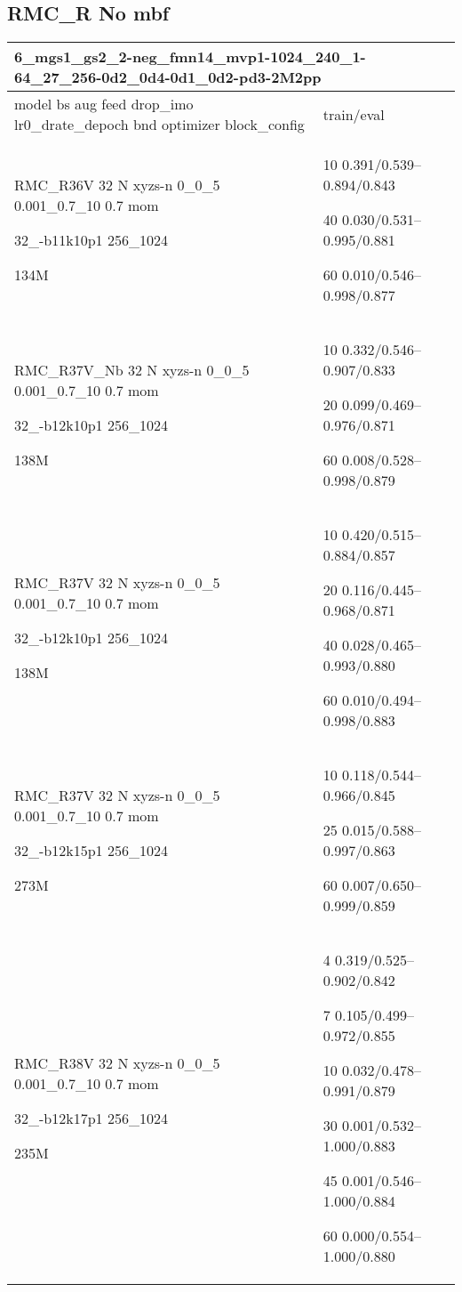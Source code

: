 \documentclass[,table,dvipsnames]{article}
\begin{document}
\subsection{RMC\_R No mbf}
\noindent\begin{tabular}{|p{10cm}|p{5cm}| }	
	\hline
	\multicolumn{2}{|p{15cm}|}{ 6\_mgs1\_gs2\_2-neg\_fmn14\_mvp1-1024\_240\_1-64\_27\_256-0d2\_0d4-0d1\_0d2-pd3-2M2pp}\\
	\hline
	model bs aug feed drop\_imo lr0\_drate\_depoch bnd optimizer block\_config & train/eval \\
	
	\rowcolor{red!20}
	RMC\_R36V 32 N xyzs-n 0\_0\_5 0.001\_0.7\_10 0.7 mom\par 32\_-b11k10p1 256\_1024\par 134M& 10 0.391/0.539--0.894/0.843\par 40 0.030/0.531--0.995/0.881\par 60 0.010/0.546--0.998/0.877\\
		
	\rowcolor{blue!20}
	RMC\_R37V\_Nb 32 N xyzs-n 0\_0\_5 0.001\_0.7\_10 0.7 mom\par 32\_-b12k10p1 256\_1024\par 138M&  10 0.332/0.546--0.907/0.833\par 20 0.099/0.469--0.976/0.871\par 60 0.008/0.528--0.998/0.879\\
	
	\rowcolor{green!20}
	RMC\_R37V 32 N xyzs-n 0\_0\_5 0.001\_0.7\_10 0.7 mom\par  32\_-b12k10p1 256\_1024\par 138M& 10 0.420/0.515--0.884/0.857\par 20 0.116/0.445--0.968/0.871\par 40 0.028/0.465--0.993/0.880\par 60 0.010/0.494--0.998/0.883\\
	
	\rowcolor{yellow!20}
	RMC\_R37V 32 N xyzs-n 0\_0\_5 0.001\_0.7\_10 0.7 mom \par 32\_-b12k15p1 256\_1024\par 273M& 10 0.118/0.544--0.966/0.845\par 25 0.015/0.588--0.997/0.863\par 60 0.007/0.650--0.999/0.859\\
	
	
	\rowcolor{blue!20}
	RMC\_R38V 32 N xyzs-n 0\_0\_5 0.001\_0.7\_10 0.7 mom \par 32\_-b12k17p1 256\_1024\par 235M& 
	4 0.319/0.525--0.902/0.842\par 7 0.105/0.499--0.972/0.855\par 10 0.032/0.478--0.991/0.879\par 30 0.001/0.532--1.000/0.883\par 45 0.001/0.546--1.000/0.884\par 60 0.000/0.554--1.000/0.880\\
	

\end{tabular}
\end{document}
